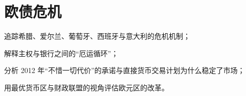 \chapter{欧债危机}\label{ch:eurocrisis}

\begin{chapterguide}
\begin{guidegoals}
\item 追踪希腊、爱尔兰、葡萄牙、西班牙与意大利的危机机制；
\item 解释主权与银行之间的“厄运循环”；
\item 分析 2012 年“不惜一切代价”的承诺与直接货币交易计划为什么稳定了市场；
\item 用最优货币区与财政联盟的视角评估欧元区的改革。
\end{guidegoals}
\end{chapterguide}

\chapterstub
